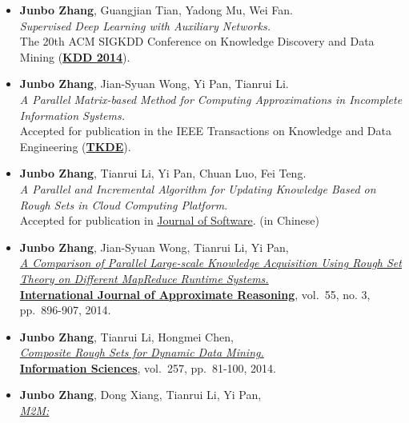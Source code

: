 \documentclass[]{article}
\begin{document}
\begin{itemize}
\item
  \textbf{Junbo Zhang}, Guangjian Tian, Yadong Mu, Wei Fan.\\
  \emph{Supervised Deep Learning with Auxiliary Networks.}\\ The 20th
  ACM SIGKDD Conference on Knowledge Discovery and Data Mining
  (\href{http://www.kdd.org/kdd2014/}{\textbf{KDD 2014}}).
\item
  \textbf{Junbo Zhang}, Jian-Syuan Wong, Yi Pan, Tianrui Li.\\ \emph{A
  Parallel Matrix-based Method for Computing Approximations in
  Incomplete Information Systems.}\\ Accepted for publication in the
  IEEE Transactions on Knowledge and Data Engineering
  (\href{http://www.computer.org/portal/web/tkde}{\textbf{TKDE}}).
\item
  \textbf{Junbo Zhang}, Tianrui Li, Yi Pan, Chuan Luo, Fei Teng.\\
  \emph{A Parallel and Incremental Algorithm for Updating Knowledge
  Based on Rough Sets in Cloud Computing Platform}.\\ Accepted for
  publication in \href{http://www.jos.org.cn/ch/index.aspx}{Journal of
  Software}. (in Chinese)
\item
  \textbf{Junbo Zhang}, Jian-Syuan Wong, Tianrui Li, Yi Pan,\\
  \href{http://dx.doi.org/10.1016/j.ijar.2013.08.003}{\emph{A Comparison
  of Parallel Large-scale Knowledge Acquisition Using Rough Set Theory
  on Different MapReduce Runtime Systems.}}\\
  \href{http://www.journals.elsevier.com/international-journal-of-approximate-reasoning}{\textbf{International
  Journal of Approximate Reasoning}}, vol.~55, no. 3, pp.~896-907, 2014.
\item
  \textbf{Junbo Zhang}, Tianrui Li, Hongmei Chen,\\
  \href{http://dx.doi.org/10.1016/j.ins.2013.08.016}{\emph{Composite
  Rough Sets for Dynamic Data Mining.}}\\
  \href{http://www.journals.elsevier.com/information-sciences}{\textbf{Information
  Sciences}}, vol.~257, pp.~81-100, 2014.
\item
  \textbf{Junbo Zhang}, Dong Xiang, Tianrui Li, Yi Pan,\\
  \href{http://ieeexplore.ieee.org/xpl/articleDetails.jsp?tp=\&arnumber=6449402\&contentType=Journals+\%26+Magazines\&queryText\%3DM2M\%3A+A+simple+Matlab-to-MapReduce+translator+for+Cloud+Computing}{\emph{M2M:
}}
\end{itemize}
\end{document}
